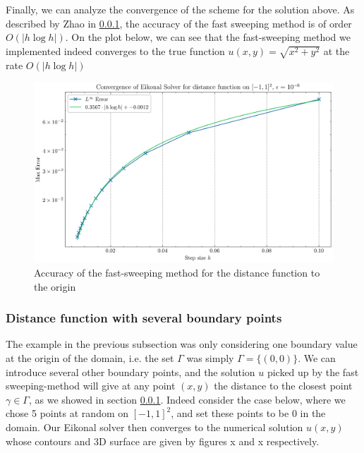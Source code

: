 \documentclass[11pt]{article}
\theoremstyle{definition}
\theoremstyle{remark}
\begin{document}
\noindent Finally, we can analyze the convergence of the scheme for the solution above. As described by Zhao in \ref{}, the accuracy of the fast sweeping method is of order $O(|h\log h|)$. On the plot below, we can see that the fast-sweeping method we implemented indeed converges to the true function $u(x,y)=\sqrt{x^2+y^2}$ at the rate $O(|h\log h|)$


\begin{figure}[h]
  \centering
  \includegraphics[width=0.7\linewidth]{plots/convergence2d_step_size.png}
  \caption{Accuracy of the fast-sweeping method for the distance function to the origin}
  \label{fig:error_distance}
\end{figure}

\subsubsection{Distance function with several boundary points}
The example in the previous subsection was only considering one boundary value at the origin of the domain, i.e. the set $\Gamma$ was simply $\Gamma=\{(0,0)\}$. We can introduce several other boundary points, and the solution $u$ picked up by the fast sweeping-method will give at any point $(x,y)$ the distance to the closest point $\gamma\in\Gamma$, as we showed in section \ref{}. Indeed consider the case below, where we chose 5 points at random on $[-1,1]^2$, and set these points to be 0 in the domain. Our Eikonal solver then converges to the numerical solution $u(x,y)$ whose contours and 3D surface are given by figures x and x respectively.

\vspace{5pt}
\end{document}

